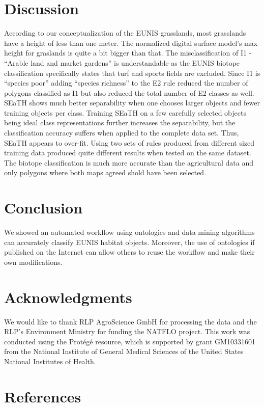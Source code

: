 \documentclass[authoryear, review,12pt,number]{elsarticle}
\begin{document}
\section{Discussion}
According to our conceptualization of the EUNIS grasslands, most grasslands 
have a height of less than one meter. The normalized digital surface model's 
max height for graslands is quite a bit bigger than that.
The misclassification of I1 - ``Arable land and market gardens'' is 
understandable as the EUNIS biotope classification specifically states that 
turf and sports fields are excluded. Since I1 is ``species poor'' adding 
``species richness'' to the E2 rule reduced the number of polygons classified 
as I1 but also reduced the total number of E2 classes as well.\\
SEaTH shows much better separability when one chooses
larger objects and fewer training objects per class. Training SEaTH on a few
carefully selected objects being ideal class representations further increases
the separability, but the classification accuracy suffers when applied to the
complete data set. Thus, SEaTH appears to over-fit. Using two sets of rules 
produced from different sized training data produced quite different results 
when tested on the same dataset. The biotope classification is much more 
accurate than the agricultural data and only polygons where both maps agreed 
shold have been selected.
\section{Conclusion}
We showed an automated workflow using ontologies and data mining algorithms can 
accurately classify EUNIS habitat objects. Moreover, the use of ontologies if 
published on the Internet can allow others to reuse the workflow and make their 
own modifications. 
\section{Acknowledgments}
We would like to thank RLP AgroScience GmbH for processing the data and the
RLP's Environment Ministry for funding the NATFLO project. This work was
conducted using the Prot\'eg\'e resource, which is supported by grant GM10331601
from the National Institute of General Medical Sciences of the United States
National
Institutes of Health.

\section{References}  
\end{document}
